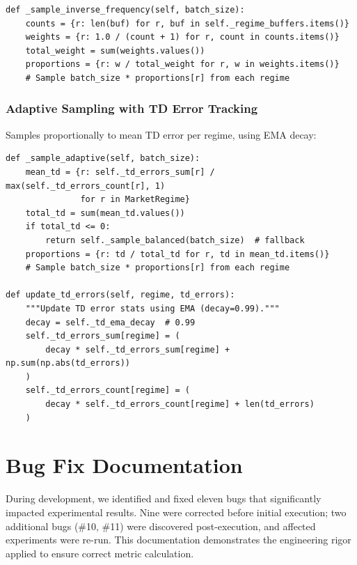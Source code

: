 \documentclass[11pt,a4paper]{article}
\begin{document}
\begin{lstlisting}[caption={Inverse-frequency sampling},label={lst:inverse-freq}]
def _sample_inverse_frequency(self, batch_size):
    counts = {r: len(buf) for r, buf in self._regime_buffers.items()}
    weights = {r: 1.0 / (count + 1) for r, count in counts.items()}
    total_weight = sum(weights.values())
    proportions = {r: w / total_weight for r, w in weights.items()}
    # Sample batch_size * proportions[r] from each regime
\end{lstlisting}

\subsubsection{Adaptive Sampling with TD Error Tracking}
Samples proportionally to mean TD error per regime, using EMA decay:

\begin{lstlisting}[caption={Adaptive sampling and TD error update},label={lst:adaptive}]
def _sample_adaptive(self, batch_size):
    mean_td = {r: self._td_errors_sum[r] / max(self._td_errors_count[r], 1)
               for r in MarketRegime}
    total_td = sum(mean_td.values())
    if total_td <= 0:
        return self._sample_balanced(batch_size)  # fallback
    proportions = {r: td / total_td for r, td in mean_td.items()}
    # Sample batch_size * proportions[r] from each regime

def update_td_errors(self, regime, td_errors):
    """Update TD error stats using EMA (decay=0.99)."""
    decay = self._td_ema_decay  # 0.99
    self._td_errors_sum[regime] = (
        decay * self._td_errors_sum[regime] + np.sum(np.abs(td_errors))
    )
    self._td_errors_count[regime] = (
        decay * self._td_errors_count[regime] + len(td_errors)
    )
\end{lstlisting}



\section{Bug Fix Documentation}
\label{app:bugs}

During development, we identified and fixed eleven bugs that significantly impacted experimental results. Nine were corrected before initial execution; two additional bugs (\#10, \#11) were discovered post-execution, and affected experiments were re-run. This documentation demonstrates the engineering rigor applied to ensure correct metric calculation.
\end{document}
